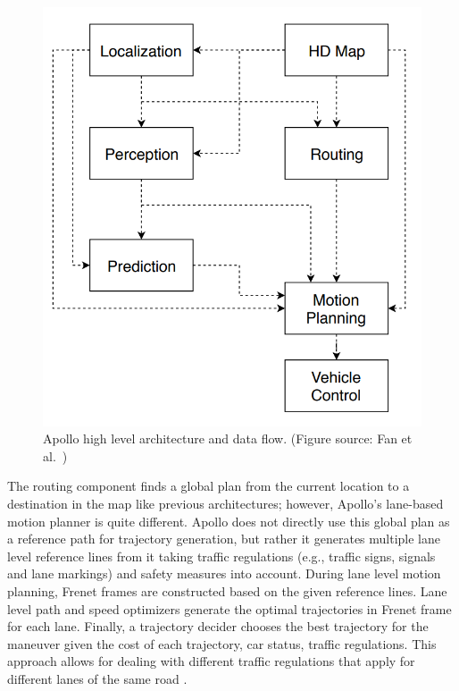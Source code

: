 \begin{figure}[h]
  \centering
  \includegraphics[width=.8\textwidth]{figures/apollo.png}
  \caption[Apollo high level architecture]{Apollo high level architecture and
    data flow. (Figure source: Fan et al.\ \cite{Fan2018BaiduAE})}
  \label{figure:apollo}
\end{figure}

The routing component finds a global plan from the current location
to a destination in the map like previous architectures; however, Apollo's
lane-based motion planner is quite different. Apollo does not directly use
this global plan as a reference path for trajectory generation, but rather it
generates multiple lane level reference lines from it taking traffic
regulations (e.g., traffic signs, signals and lane markings) and safety
measures into account. During lane level motion planning, Frenet frames are
constructed based on the given reference lines. Lane level path and speed
optimizers generate the optimal trajectories in Frenet frame for each lane.
Finally, a trajectory decider chooses the best trajectory for the maneuver
given the cost of each trajectory, car status, traffic regulations. This
approach allows for dealing with different traffic regulations that apply for
different lanes of the same road \cite{Fan2018BaiduAE}.

